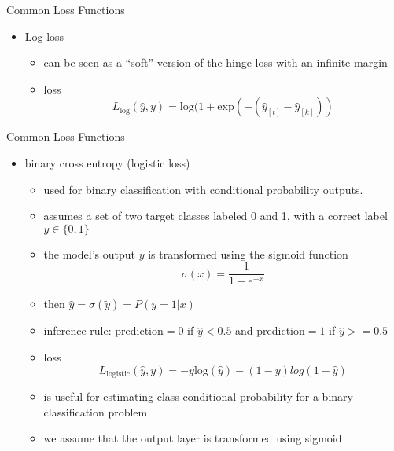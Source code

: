 \begin{frame}{Common Loss Functions}
    \begin{itemize}
        \item Log loss
        \begin{itemize}
            \item<1-> can be seen as a ``soft'' version of the hinge loss with an infinite margin 
             \item<2-> loss
                \begin{equation*}
              L_{\text{log}} (\hat{y}, y) = \text{log}(1+\text{exp}(-(\hat{y}_{[t]}-\hat{y}_{[k]}))
            \end{equation*}
        \end{itemize}
    \end{itemize}
\end{frame}
\begin{frame}{Common Loss Functions}
    \begin{itemize}
        \item<1-> binary cross entropy (logistic loss)
        \begin{itemize}
            \item<2-> used for binary classification with conditional probability outputs. 
            \item<3-> assumes a set of two target classes labeled 0 and 1, with a correct label $y\in \{0, 1\}$
            \item<4-> the model’s output $\tilde{y}$ is transformed using the sigmoid function
            \begin{equation*}
                \sigma(x) = \frac{1}{1+e^{-x}}
            \end{equation*}
            \item<5-> then $\hat{y} = \sigma(\tilde{y}) = P(y=1|x)$
            \item<6-> inference rule: prediction$=0$ if $\hat{y}<0.5$ and prediction$=1$ if $\hat{y}>=0.5$
             \item<7-> loss
                \begin{equation*}
              L_{\text{logistic}} (\hat{y}, y) = -y\text{log}(\hat{y}) -(1-y)log(1-\hat{y})
            \end{equation*}
            \item<8->  is useful for estimating class conditional probability for a binary classification problem
            \item<9-> we assume that the output layer is transformed using sigmoid
        \end{itemize}
    \end{itemize}
\end{frame}
